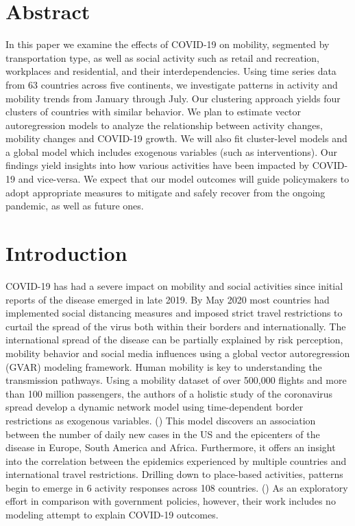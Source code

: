 \documentclass[titlepage,oneside,12pt]{article}
\newcommand{\trbcite}[1]{({\it \citenum{#1}})}
\newcommand{\?}{\stackrel{?}{=}}
\begin{document}
\section{Abstract}
In this paper we examine the effects of COVID-19 on mobility, segmented by transportation type, as well as social activity such as retail and recreation, workplaces and residential, and their interdependencies.
Using time series data from 63 countries across five continents,
we investigate patterns in activity and mobility trends from January through July.
Our clustering approach yields four clusters of countries with similar behavior.
We plan to estimate vector autoregression models  to analyze the relationship between activity changes, mobility changes and COVID-19 growth.
We will also fit cluster-level models and a global model which includes exogenous variables (such as interventions).
Our findings yield insights into how various activities have been impacted by COVID-19 and vice-versa.
We expect that our model outcomes will guide policymakers to adopt  appropriate  measures to mitigate and safely recover from the ongoing pandemic, as well as future ones.

\section{Introduction}
COVID-19 has had a severe impact on mobility and social activities since initial reports of the disease emerged in late 2019. By May 2020 most countries had implemented social distancing measures and imposed strict travel restrictions to curtail the spread of the virus both within their borders and internationally.
The international spread of the disease can be partially explained by risk perception, mobility behavior and social media influences using a global vector autoregression (GVAR) modeling framework\cite{milani2020covid19}.
Human mobility is key to understanding the transmission pathways. Using a mobility dataset of over 500,000 flights and more than 100 million passengers, the authors of a holistic study of the coronavirus spread develop a dynamic network model using time-dependent border restrictions as exogenous variables. \trbcite{zhang2020pathways} This model discovers an association between the number of daily new cases in the US and the epicenters of the disease in Europe, South America and Africa. Furthermore, it offers an insight into the correlation between the epidemics experienced by multiple countries and international travel restrictions.
Drilling down to place-based activities, patterns begin to emerge in 6 activity responses across 108 countries. \trbcite{mckenzie2020country} As an exploratory effort in comparison with government policies, however, their work includes no modeling attempt to explain COVID-19 outcomes. 
\end{document}

